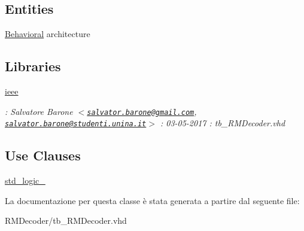 \subsection*{Entities}
\begin{DoxyCompactItemize}
\item 
\hyperlink{classtb___r_m_decoder_1_1_behavioral}{Behavioral} architecture
\end{DoxyCompactItemize}
\subsection*{Libraries}
 \begin{DoxyCompactItemize}
\item 
\hypertarget{classtb___r_m_decoder_a0a6af6eef40212dbaf130d57ce711256}{\hyperlink{classtb___r_m_decoder_a0a6af6eef40212dbaf130d57ce711256}{ieee} }\label{classtb___r_m_decoder_a0a6af6eef40212dbaf130d57ce711256}

\begin{DoxyCompactList}\small\item\em \+: Salvatore Barone $<$\href{mailto:salvator.barone@gmail.com}{\tt salvator.\+barone@gmail.\+com}, \href{mailto:salvator.barone@studenti.unina.it}{\tt salvator.\+barone@studenti.\+unina.\+it}$>$ \+: 03-\/05-\/2017 \+: tb\+\_\+\+R\+M\+Decoder.\+vhd \end{DoxyCompactList}\end{DoxyCompactItemize}
\subsection*{Use Clauses}
 \begin{DoxyCompactItemize}
\item 
\hypertarget{classtb___r_m_decoder_gacd03516902501cd1c7296a98e22c6fcb}{\hyperlink{group___r_m_decoder_gacd03516902501cd1c7296a98e22c6fcb}{std\+\_\+logic\+\_}   }\label{classtb___r_m_decoder_gacd03516902501cd1c7296a98e22c6fcb}

\end{DoxyCompactItemize}


La documentazione per questa classe è stata generata a partire dal seguente file\+:\begin{DoxyCompactItemize}
\item 
R\+M\+Decoder/tb\+\_\+\+R\+M\+Decoder.\+vhd\end{DoxyCompactItemize}
